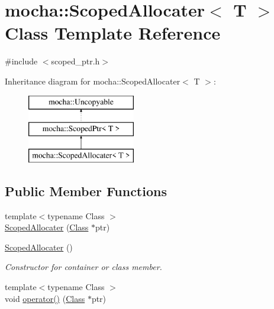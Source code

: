 \hypertarget{classmocha_1_1_scoped_allocater}{
\section{mocha::ScopedAllocater$<$ T $>$ Class Template Reference}
\label{classmocha_1_1_scoped_allocater}
}


{\ttfamily \#include $<$scoped\_\-ptr.h$>$}

Inheritance diagram for mocha::ScopedAllocater$<$ T $>$:\begin{figure}[H]
\begin{center}
\leavevmode
\includegraphics[height=3.000000cm]{classmocha_1_1_scoped_allocater}
\end{center}
\end{figure}
\subsection*{Public Member Functions}
\begin{DoxyCompactItemize}
\item 
{\footnotesize template$<$typename Class $>$ }\\\hyperlink{classmocha_1_1_scoped_allocater_a66466e6652d79f760303e41804f4f26c}{ScopedAllocater} (\hyperlink{classmocha_1_1_class}{Class} $\ast$ptr)
\begin{DoxyCompactList}\small\item\em \end{DoxyCompactList}\item 
\hyperlink{classmocha_1_1_scoped_allocater_a14f31025128359fcddbbbd364d8cff09}{ScopedAllocater} ()
\begin{DoxyCompactList}\small\item\em Constructor for container or class member. \end{DoxyCompactList}\item 
{\footnotesize template$<$typename Class $>$ }\\void \hyperlink{classmocha_1_1_scoped_allocater_afc2ba7dd48d4828befa676a67d37d957}{operator()} (\hyperlink{classmocha_1_1_class}{Class} $\ast$ptr)
\end{DoxyCompactItemize}


